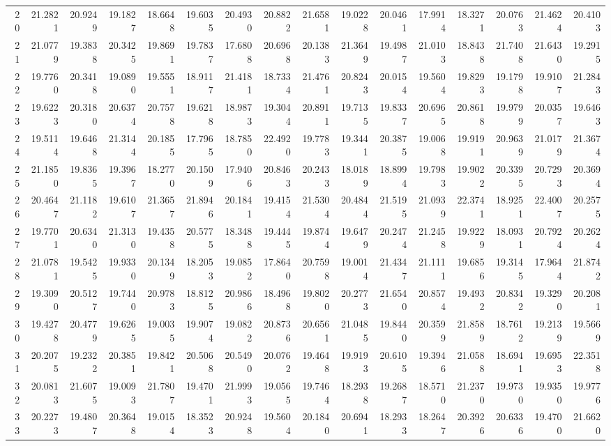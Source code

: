 \documentclass[12pt]{article}\usepackage[]{graphicx}\usepackage[]{color}
\begin{document}
\begin{landscape}
\begin{longtable}[t]{rrrrrrrrrrrrrrrr}
20 & 21.2821 & 20.9249 & 19.1827 & 18.6648 & 19.6035 & 20.4930 & 20.8822 & 21.6581 & 19.0228 & 20.0461 & 17.9914 & 18.3271 & 20.0763 & 21.4624 & 20.4103\\
21 & 21.0779 & 19.3838 & 20.3425 & 19.8691 & 19.7837 & 17.6808 & 20.6968 & 20.1383 & 21.3649 & 19.4987 & 21.0103 & 18.8438 & 21.7408 & 21.6430 & 19.2915\\
22 & 19.7760 & 20.3418 & 19.0890 & 19.5551 & 18.9117 & 21.4181 & 18.7334 & 21.4761 & 20.8243 & 20.0154 & 19.5604 & 19.8293 & 19.1798 & 19.9107 & 21.2843\\
23 & 19.6223 & 20.3180 & 20.6374 & 20.7578 & 19.6218 & 18.9873 & 19.3044 & 20.8911 & 19.7135 & 19.8337 & 20.6965 & 20.8618 & 19.9799 & 20.0357 & 19.6463\\
24 & 19.5114 & 19.6468 & 21.3144 & 20.1855 & 17.7965 & 18.7850 & 22.4920 & 19.7783 & 19.3441 & 20.3875 & 19.0068 & 19.9191 & 20.9639 & 21.0179 & 21.3674\\
25 & 21.1850 & 19.8365 & 19.3967 & 18.2770 & 20.1509 & 17.9406 & 20.8463 & 20.2433 & 18.0189 & 18.8994 & 19.7983 & 19.9022 & 20.3395 & 20.7293 & 20.3694\\
26 & 20.4647 & 21.1182 & 19.6107 & 21.3657 & 21.8946 & 20.1841 & 19.4154 & 21.5304 & 20.4844 & 21.5195 & 21.0939 & 22.3741 & 18.9251 & 22.4007 & 20.2575\\
27 & 19.7701 & 20.6340 & 21.3130 & 19.4358 & 20.5775 & 18.3488 & 19.4445 & 19.8744 & 19.6479 & 20.2474 & 21.2458 & 19.9229 & 18.0931 & 20.7924 & 20.2624\\
28 & 21.0781 & 19.5425 & 19.9330 & 20.1349 & 18.2053 & 19.0852 & 17.8640 & 20.7598 & 19.0014 & 21.4347 & 21.1111 & 19.6856 & 19.3145 & 17.9644 & 21.8742\\
29 & 19.3090 & 20.5127 & 19.7440 & 20.9783 & 18.8125 & 20.9866 & 18.4968 & 19.8020 & 20.2773 & 21.6540 & 20.8574 & 19.4932 & 20.8342 & 19.3290 & 20.2081\\
30 & 19.4278 & 20.4779 & 19.6265 & 19.0035 & 19.9074 & 19.0822 & 20.8736 & 20.6561 & 21.0485 & 19.8440 & 20.3599 & 21.8589 & 18.7612 & 19.2139 & 19.5669\\
31 & 20.2075 & 19.2322 & 20.3851 & 19.8421 & 20.5068 & 20.5490 & 20.0762 & 19.4648 & 19.9193 & 20.6105 & 19.3946 & 21.0588 & 18.6941 & 19.6953 & 22.3518\\
32 & 20.0813 & 21.6075 & 19.0093 & 21.7807 & 19.4701 & 21.9993 & 19.0565 & 19.7464 & 18.2938 & 19.2687 & 18.5710 & 21.2370 & 19.9730 & 19.9350 & 19.9776\\
33 & 20.2273 & 19.4807 & 20.3648 & 19.0154 & 18.3523 & 20.9248 & 19.5604 & 20.1840 & 20.6941 & 18.2933 & 18.2647 & 20.3926 & 20.6336 & 19.4700 & 21.6620\\

\end{longtable}
\end{landscape}
\end{document}
